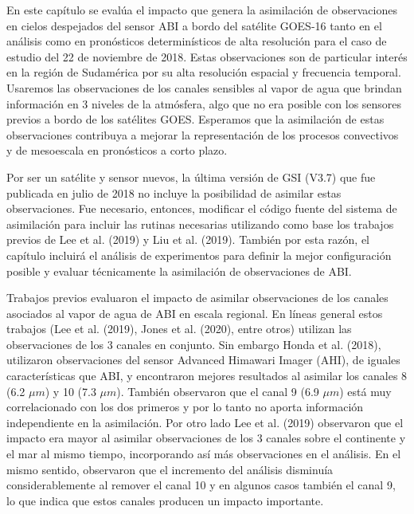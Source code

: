 \documentclass[12pt,oneside,a4paper]{reedthesis}
\begin{document}
En este capítulo se evalúa el impacto que genera la asimilación de observaciones en cielos despejados del sensor ABI a bordo del satélite GOES-16 tanto en el análisis como en pronósticos determinísticos de alta resolución para el caso de estudio del 22 de noviembre de 2018. Estas observaciones son de particular interés en la región de Sudamérica por su alta resolución espacial y frecuencia temporal. Usaremos las observaciones de los canales sensibles al vapor de agua que brindan información en 3 niveles de la atmósfera, algo que no era posible con los sensores previos a bordo de los satélites GOES. Esperamos que la asimilación de estas observaciones contribuya a mejorar la representación de los procesos convectivos y de mesoescala en pronósticos a corto plazo.

Por ser un satélite y sensor nuevos, la última versión de GSI (V3.7) que fue publicada en julio de 2018 no incluye la posibilidad de asimilar estas observaciones. Fue necesario, entonces, modificar el código fuente del sistema de asimilación para incluir las rutinas necesarias utilizando como base los trabajos previos de Lee et al. (2019) y Liu et al. (2019). También por esta razón, el capítulo incluirá el análisis de experimentos para definir la mejor configuración posible y evaluar técnicamente la asimilación de observaciones de ABI.

Trabajos previos evaluaron el impacto de asimilar observaciones de los canales asociados al vapor de agua de ABI en escala regional. En líneas general estos trabajos (Lee et al. (2019), Jones et al. (2020), entre otros) utilizan las observaciones de los 3 canales en conjunto. Sin embargo Honda et al. (2018), utilizaron observaciones del sensor Advanced Himawari Imager (AHI), de iguales características que ABI, y encontraron mejores resultados al asimilar los canales 8 (6.2 \(\mu m\)) y 10 (7.3 \(\mu m\)). También observaron que el canal 9 (6.9 \(\mu m\)) está muy correlacionado con los dos primeros y por lo tanto no aporta información independiente en la asimilación. Por otro lado Lee et al. (2019) observaron que el impacto era mayor al asimilar observaciones de los 3 canales sobre el continente y el mar al mismo tiempo, incorporando así más observaciones en el análisis. En el mismo sentido, observaron que el incremento del análisis disminuía considerablemente al remover el canal 10 y en algunos casos también el canal 9, lo que indica que estos canales producen un impacto importante.
\end{document}
